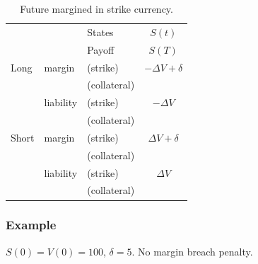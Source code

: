 \documentclass[12pt]{article}
\begin{document}
\begin{table}
\centering
\begin{tabular}{lll|c}
\hline
&  & States & $S(t)$\\
&  & Payoff &  $S(T)$\\
\hline
Long      & margin    & (strike)     & $-\Delta V + \delta$  \\
          &           & (collateral) &\\
          & liability & (strike)     & $-\Delta V$\\
          &           & (collateral)&\\
\hline
Short     & margin    & (strike)     & $\Delta V + \delta$ \\
          &           & (collateral) &\\
          & liability & (strike)     & $\Delta V$\\
          &           & (collateral) &\\          
\hline
\end{tabular}
\caption{Future margined in strike currency.}
\label{tab:futstrike}
\end{table}

\subsubsection*{Example}

$S(0)=V(0)=100$, $\delta=5$. No margin breach penalty.
\end{document}
